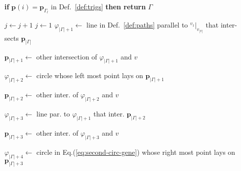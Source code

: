 \documentclass[letterpaper,10pt,journal,twoside]{IEEEtran}
\theoremstyle{definition}
\begin{document}
\begin{algorithm}[t]
  \begin{algorithmic}[1]
    \small

      \STATE \textbf{if} $\mathbf{p}(i)=\mathbf{p}_{\Gamma_l}${ in Def.~\ref{def:trigs}} \textbf{then return }$\Gamma$\vspace*{.3ex}

        

      \vspace*{.8ex}
        \STATE $j\gets j+1$\vspace*{.3ex}
          \STATE $j\gets 1$\vspace*{.3ex}
          \STATE $\varphi_{|\Gamma|+1}\gets$ line in Def.~\ref{def:paths} %
          parallel to ${}^{v_1}|_{v_{|v|}}$ that inter-\vspace*{.5ex} \hspace*{1em}sects $\mathbf{p}_{|\Gamma|}$\vspace*{.3ex}

          \STATE $\mathbf{p}_{|\Gamma|+1}\gets$ other intersection %
          of $\varphi_{|\Gamma|+1}$ and $v$\vspace*{.3ex}

          \STATE $\varphi_{|\Gamma|+2}\gets$ circle %
          whose left most point lays on $\mathbf{p}_{|\Gamma|+1}$\vspace*{.3ex}\label{alg2:circ1}
          
          \STATE $\mathbf{p}_{|\Gamma|+2}\gets$ other inter. %
          of $\varphi_{|\Gamma|+2}$ and $v$\vspace*{.3ex}

          \STATE $\varphi_{|\Gamma|+3}\gets$ line %
          par. to $\varphi_{|\Gamma|+1}$ that inter. $\mathbf{p}_{|\Gamma|+2}$\vspace*{.3ex}

          \STATE $\mathbf{p}_{|\Gamma|+3}\gets$ other inter. %
          of $\varphi_{|\Gamma|+3}$ and $v$\vspace*{.3ex}

          \STATE $\varphi_{|\Gamma|+4}\gets$ circle in Eq.\hspace*{.7ex}(\ref{eq:second-circ-gene}) 
          whose right most point lays\vspace*{.3ex} \hspace*{1em}on $\mathbf{p}_{|\Gamma|+3}$\vspace*{.3ex}\label{alg2:circ2}


\end{algorithmic}
\end{algorithm}
\end{document}

